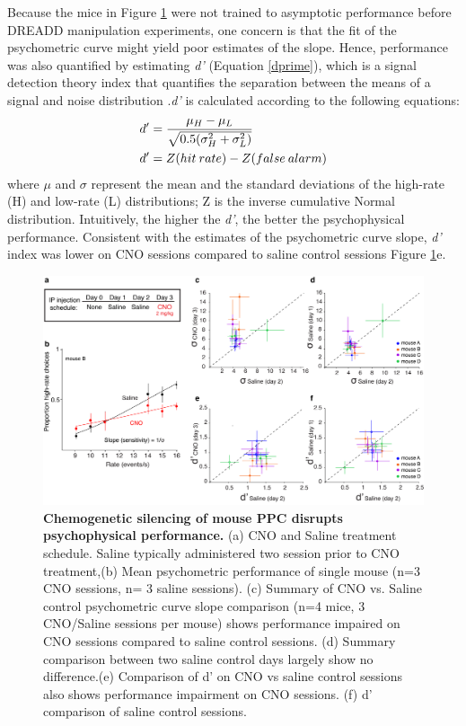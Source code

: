 Because the mice in Figure \ref{fig:dreaddallmice} were not trained to asymptotic performance before DREADD manipulation experiments, one concern is that the fit of the psychometric curve might yield poor estimates of the slope. Hence, performance was also quantified by estimating \emph{d'} (Equation \ref{dprime}), which is a signal detection theory index that quantifies the separation between the means of a signal and noise distribution \parencite{Macmillian,Green1989}.\emph{d'} is calculated according to the following equations:
\begin{equation}
\begin{aligned}	
    \centering
	d' &= \frac{\mu_H  - \mu_L}{\sqrt{0.5(\sigma^2_H + \sigma^2_L)}} \\
    d' &= Z(hit \: rate) - Z(false \: alarm)
\end{aligned}
\label{dprime}
\end{equation}
where $\mu$ and $\sigma$ represent the mean and the standard deviations of the high-rate (H) and low-rate (L) distributions; Z is the inverse cumulative Normal distribution. Intuitively, the higher the \emph{d'}, the better the psychophysical performance. Consistent with the estimates of the psychometric curve slope, \emph{d'} index was lower on CNO sessions compared to saline control sessions Figure \ref{fig:dreaddallmice}e.\par
\begin{figure}
  \centering
  	\includegraphics[width=\textwidth]{Figures/chapter3/psychophysics_dreadd_disruption.png}
  \caption[Chemogenetic silencing of mouse PPC disrupts psychophysical performance]{\textbf{Chemogenetic silencing of mouse PPC disrupts psychophysical performance.} (a) CNO and Saline treatment schedule. Saline typically administered two session prior to CNO treatment,(b) Mean psychometric performance of single mouse (n=3 CNO sessions, n= 3 saline sessions). (c) Summary of CNO vs. Saline control psychometric curve slope comparison (n=4 mice, 3 CNO/Saline sessions per mouse) shows performance impaired on CNO sessions compared to saline control sessions. (d) Summary comparison between two saline control days largely show no difference.(e) Comparison of d' on CNO vs saline control sessions also shows performance impairment on CNO sessions. (f) d' comparison of saline control sessions.}
  \label{fig:dreaddallmice}
\end{figure}
